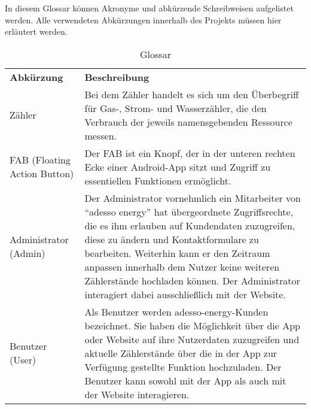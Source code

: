 \begin{tcolorbox}
	In diesem Glossar können Akronyme und abkürzende Schreibweisen aufgelistet werden. 
	Alle verwendeten Abkürzungen innerhalb des Projekts müssen hier erläutert werden.
\end{tcolorbox}

\begin{table}[h]
	\centering
	\begin{tabularx}{\textwidth}{X X}
		\rowcolor[HTML]{C0C0C0} 
		\textbf{Abkürzung} & \textbf{Beschreibung} \\
		Zähler & Bei dem Zähler handelt es sich um den Überbegriff für Gas-, Strom- und Wasserzähler, die den Verbrauch der jeweils namensgebenden Ressource messen. \\
		\rowcolor[HTML]{E7E7E7} 
		FAB (Floating Action Button) & Der FAB ist ein Knopf, der in der unteren rechten Ecke einer Android-App sitzt und Zugriff zu essentiellen Funktionen ermöglicht. \\
		Administrator (Admin) & Der Administrator vornehmlich ein Mitarbeiter von “adesso energy” hat übergeordnete Zugriffsrechte, die es ihm erlauben auf Kundendaten zuzugreifen, diese zu ändern und Kontaktformulare zu bearbeiten. Weiterhin kann er den Zeitraum anpassen innerhalb dem Nutzer keine weiteren Zählerstände hochladen können. Der Administrator interagiert dabei ausschließlich mit der Website. \\
		\rowcolor[HTML]{E7E7E7} 
		Benutzer (User) & Als Benutzer werden adesso-energy-Kunden bezeichnet. Sie haben die Möglichkeit über die App oder Website auf ihre Nutzerdaten zuzugreifen und aktuelle Zählerstände über die in der App zur Verfügung gestellte Funktion hochzuladen. Der Benutzer kann sowohl mit der App als auch mit der Website interagieren.
	\end{tabularx}
	\caption{Glossar}
	\label{table:glossar}
\end{table}